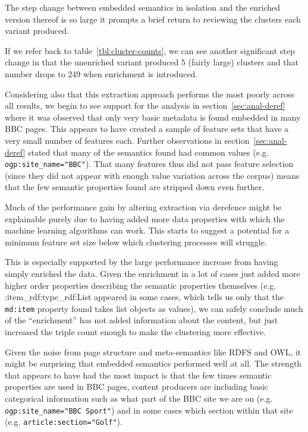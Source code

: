 The step change between embedded semantics in isolation and the
enriched version thereof is so large it prompts a brief return to
reviewing the clusters each variant produced.

If we refer back to table~\ref{tbl:cluster-counts}, we can see
another significant step change in that the unenriched variant
produced 5 (fairly large) clusters and that number drops to 249 when
enrichment is introduced.

Considering also that this extraction approach performs the most
poorly across all results, we begin to see support for the analysis
in section~\ref{sec:anal-deref} where it was observed that only very
basic metadata is found embedded in many BBC pages. This appears to
have created a sample of feature sets that have a very small number
of features each. Further observations in
section~\ref{sec:anal-deref} stated that
many of the semantics found had
common values (e.g. \texttt{ogp:site\_name="BBC"}). That many features
thus did not pass feature selection (since they did not appear
with enough value variation across the corpus) means that the few
semantic properties found are stripped down even further.

Much of the performance gain by altering extraction via derefence
might be explainable purely due to having added more data properties
with which the machine learning algorithms can work. This starts to
suggest a potential for a minimum feature set size below which
clustering processes will struggle.

This is especially supported by
the large performance increase from having simply enriched the data.
Given the enrichment in a lot of cases just added more higher order
properties describing the semantic properties themselves (e.g.
\textttmd:item\_rdf:type\_rdf:List{} appeared in some cases, which
tells us only that the \texttt{md:item} property found takes
list objects as values), we can safely conclude much of the
``enrichment'' has not added information about the content, but
just increased the triple count enough to make the clustering more
effective.

Given the noise from page structure and meta-semantics like RDFS and
OWL, it might be surprising that embedded semantics performed well
at all. The strength that appears to have had the most impact is that
the few times semantic properties are used in BBC pages, content
producers are including basic categorical information such as what
part of the BBC site we are on (e.g. \texttt{ogp:site\_name="BBC Sport"})
and in some cases which section within that site
(e.g. \texttt{article:section="Golf"}).

